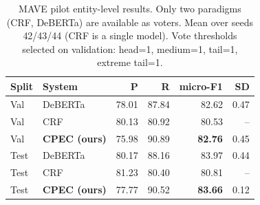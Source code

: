\begin{table}[t]\centering\small
\begin{tabular}{llrrrr}\toprule
Split & System & P & R & micro-F1 & SD \\\midrule
Val & DeBERTa & 78.01 & 87.84 & 82.62 & 0.47 \\
Val & CRF & 80.13 & 80.92 & 80.53 & -- \\
Val & \textbf{CPEC (ours)} & 75.98 & 90.89 & \textbf{82.76} & 0.45 \\
\midrule
Test & DeBERTa & 80.17 & 88.16 & 83.97 & 0.44 \\
Test & CRF & 81.23 & 80.40 & 80.81 & -- \\
Test & \textbf{CPEC (ours)} & 77.77 & 90.52 & \textbf{83.66} & 0.12 \\
\bottomrule\end{tabular}
\caption{MAVE pilot entity-level results. Only two paradigms (CRF, DeBERTa) are available as voters. Mean over seeds 42/43/44 (CRF is a single model). Vote thresholds selected on validation: head=1, medium=1, tail=1, extreme tail=1.}\label{tab:cpec_mave}\end{table}
